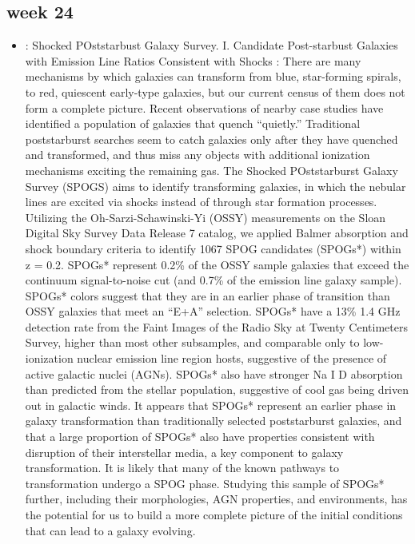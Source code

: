 \documentclass[ceqn,usenatbib,onecolumn]{mnras}
\begin{document}
\subsection{week 24}

\begin{itemize}
    \item \citet{2016ApJS..224...38A} : Shocked POststarbust Galaxy Survey. I. Candidate Post-starbust Galaxies with Emission Line Ratios Consistent with Shocks : There are many mechanisms by which galaxies can transform from blue, star-forming spirals, to red, quiescent early-type galaxies, but our current census of them does not form a complete picture. Recent observations of nearby case studies have identified a population of galaxies that quench “quietly.” Traditional poststarburst searches seem to catch galaxies only after they have quenched and transformed, and thus miss any objects with additional ionization mechanisms exciting the remaining gas. The Shocked POststarburst Galaxy Survey (SPOGS) aims to identify transforming galaxies, in which the nebular lines are excited via shocks instead of through star formation processes. Utilizing the Oh-Sarzi-Schawinski-Yi (OSSY) measurements on the Sloan Digital Sky Survey Data Release 7 catalog, we applied Balmer absorption and shock boundary criteria to identify 1067 SPOG candidates (SPOGs*) within z = 0.2. SPOGs* represent 0.2\% of the OSSY sample galaxies that exceed the continuum signal-to-noise cut (and 0.7\% of the emission line galaxy sample). SPOGs* colors suggest that they are in an earlier phase of transition than OSSY galaxies that meet an “E+A” selection. SPOGs* have a 13\% 1.4 GHz detection rate from the Faint Images of the Radio Sky at Twenty Centimeters Survey, higher than most other subsamples, and comparable only to low-ionization nuclear emission line region hosts, suggestive of the presence of active galactic nuclei (AGNs). SPOGs* also have stronger Na I D absorption than predicted from the stellar population, suggestive of cool gas being driven out in galactic winds. It appears that SPOGs* represent an earlier phase in galaxy transformation than traditionally selected poststarburst galaxies, and that a large proportion of SPOGs* also have properties consistent with disruption of their interstellar media, a key component to galaxy transformation. It is likely that many of the known pathways to transformation undergo a SPOG phase. Studying this sample of SPOGs* further, including their morphologies, AGN properties, and environments, has the potential for us to build a more complete picture of the initial conditions that can lead to a galaxy evolving.

\end{itemize}
\end{document}
